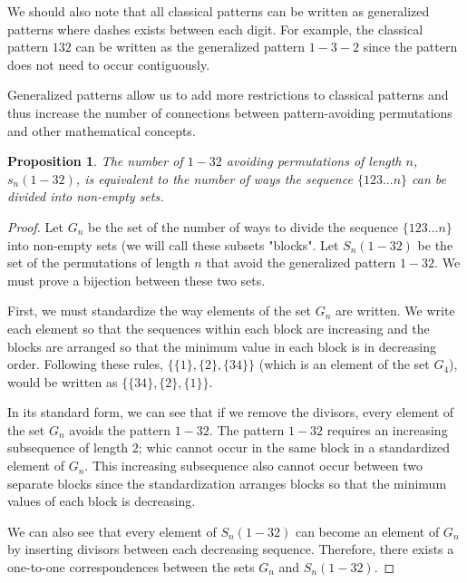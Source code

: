 \documentclass[12pt]{article}
\newtheorem{prop}{Proposition}   %
\begin{document}
We should also note that all classical patterns can be written as generalized patterns where dashes exists between each digit. For example, the classical pattern $132$ can be written as the generalized pattern $1-3-2$ since the pattern does not need to occur contiguously.

Generalized patterns allow us to add more restrictions to classical patterns and thus increase the number of connections between pattern-avoiding permutations and other mathematical concepts. 

\begin{prop}
    
    The number of $1-32$ avoiding permutations of length $n$, $s_n(1-32)$, is equivalent to the number of ways the sequence $\{123...n\}$ can be divided into non-empty sets. \cite{Claesson2001}
\end{prop}

\begin{proof}
Let $G_n$ be the set of the number of ways to divide the sequence $\{123...n\}$ into non-empty sets (we will call these subsets "blocks". Let $S_n(1-32)$ be the set of the permutations of length $n$ that avoid the generalized pattern $1-32$. We must prove a bijection between these two sets.

First, we must standardize the way elements of the set $G_n$ are written. We write each element so that the sequences within each block are increasing and the blocks are arranged so that the minimum value in each block is in decreasing order. Following these rules, $\{\{1\},\{2\},\{34\}\}$ (which is an element of the set $G_4$), would be written as  $\{\{34\},\{2\},\{1\}\}$.

In its standard form, we can see that if we remove the divisors, every element of the set $G_n$ avoids the pattern $1-32$. The pattern $1-32$ requires an increasing subsequence of length $2$; whic cannot occur in the same block in a standardized element of $G_n$. This increasing subsequence also cannot occur between two separate blocks since the standardization arranges blocks so that the minimum values of each block is decreasing. 

We can also see that every element of $S_n(1-32)$ can become an element of $G_n$ by inserting divisors between each decreasing sequence. Therefore, there exists a one-to-one correspondences between the sets $G_n$ and $S_n(1-32)$.


    
\end{proof}
\end{document}
